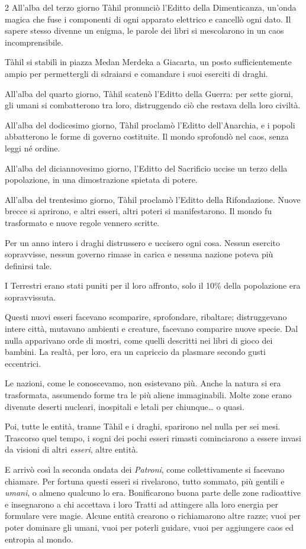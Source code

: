 \begin{multicols}{2}
All'alba del terzo giorno Tàhil pronunciò l'Editto della Dimenticanza, un'onda magica che fuse i componenti di ogni apparato elettrico e cancellò ogni dato. Il sapere stesso divenne un enigma, le parole dei libri si mescolarono in un caos incomprensibile.

Tàhil si stabilì in piazza Medan Merdeka a Giacarta, un posto sufficientemente ampio per permettergli di sdraiarsi e comandare i suoi eserciti di draghi.

All’alba del quarto giorno, Tàhil scatenò l’Editto della Guerra: per sette giorni, gli umani si combatterono tra loro, distruggendo ciò che restava della loro civiltà.

All’alba del dodicesimo giorno, Tàhil proclamò l’Editto dell’Anarchia, e i popoli abbatterono le forme di governo costituite. Il mondo sprofondò nel caos, senza leggi né ordine.

All’alba del diciannovesimo giorno, l’Editto del Sacrificio uccise un terzo della popolazione, in una dimostrazione spietata di potere.

All’alba del trentesimo giorno, Tàhil proclamò l’Editto della Rifondazione. Nuove brecce si aprirono, e altri esseri, altri poteri si manifestarono. Il mondo fu trasformato e nuove regole vennero scritte.

Per un anno intero i draghi distrussero e uccisero ogni cosa. Nessun esercito sopravvisse, nessun governo rimase in carica e nessuna nazione poteva più definirsi tale.

I Terrestri erano stati puniti per il loro affronto, solo il 10\% della popolazione era sopravvissuta.

Questi nuovi esseri facevano scomparire, sprofondare, ribaltare; distruggevano intere città, mutavano ambienti e creature, facevano comparire nuove specie. Dal nulla apparivano orde di mostri, come quelli descritti nei libri di gioco dei bambini. La realtà, per loro, era un capriccio da plasmare secondo gusti eccentrici.

Le nazioni, come le conoscevamo, non esistevano più. Anche la natura si era trasformata, assumendo forme tra le più aliene immaginabili. Molte zone erano divenute deserti nucleari, inospitali e letali per chiunque… o quasi.

Poi, tutte le entità, tranne Tàhil e i draghi, sparirono nel nulla per sei mesi.
Trascorso quel tempo, i sogni dei pochi esseri rimasti cominciarono a essere invasi da visioni di altri \emph{esseri}, altre entità.

E arrivò così la seconda ondata dei \emph{Patroni}, come collettivamente si facevano chiamare. Per fortuna questi esseri si rivelarono, tutto sommato, più gentili e \emph{umani}, o almeno qualcuno lo era. Bonificarono buona parte delle zone radioattive e insegnarono a chi accettava i loro Tratti ad attingere alla loro energia per formulare vere magie.
Alcune entità crearono o richiamarono altre razze; vuoi per poter dominare gli umani, vuoi per poterli guidare, vuoi per aggiungere caos ed entropia al mondo.


\end{multicols}
